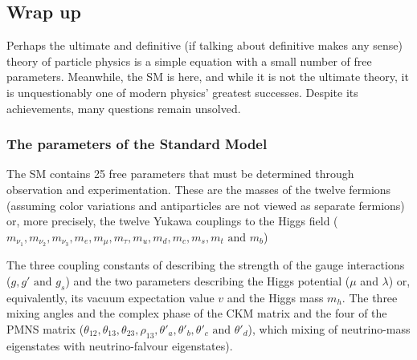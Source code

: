 

\subsection{Wrap up}
\label{sec:chap1:Wrapup}

Perhaps the ultimate and definitive (if talking about definitive makes any sense) theory of particle physics 
is a simple equation with a small number of free parameters. Meanwhile, the SM is here, and while it is not 
the ultimate theory, it is unquestionably one of modern physics' greatest successes.
Despite its achievements, many questions remain unsolved.

\subsubsection{The parameters of the Standard Model}
\label{sec:chap1:Wrapup:ParamsOfSM}
The SM contains 25 free parameters that must be determined through observation and experimentation. 
These are the masses of the twelve fermions (assuming color variations and antiparticles are not viewed as 
separate fermions) or, more precisely, the twelve Yukawa couplings to the Higgs field ($m_{\nu_{1}}, m_{\nu_{2}}, m_{\nu_{3}}, m_{e}, m_{\mu}, m_{\tau},
	m_{u}, m_{d}, m_{c}, m_{s}, m_{t} \textrm{ and }  m_{b}$)
	
The three coupling constants of describing the strength of the gauge interactions ($g, g' \textrm{ and } g_{s}$)
 and the two parameters describing the Higgs potential ($\mu$ and $\lambda$) or, equivalently, its vacuum  
expectation value $v$ and the Higgs mass $m_{h}$.
The three mixing angles and the complex phase of the CKM matrix and the four of the PMNS matrix ($\theta_{12}, \theta_{13}, \theta_{23}, \rho_{13}, \theta'_{a}, \theta'_{b}, \theta'_{c} \textrm{ and }\theta'_{d}$), which mixing of neutrino-mass eigenstates with neutrino-falvour eigenstates).

